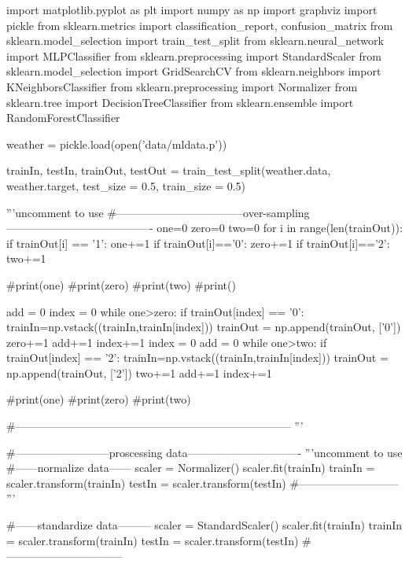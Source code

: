 \documentclass[12pt]{article}
\begin{document}
\begin{python}

import matplotlib.pyplot as plt
import numpy as np
import graphviz
import pickle
from sklearn.metrics import classification_report, confusion_matrix
from sklearn.model_selection import train_test_split
from sklearn.neural_network import MLPClassifier
from sklearn.preprocessing import StandardScaler
from sklearn.model_selection import GridSearchCV
from sklearn.neighbors import KNeighborsClassifier
from sklearn.preprocessing import Normalizer
from sklearn.tree import DecisionTreeClassifier
from sklearn.ensemble import RandomForestClassifier


weather = pickle.load(open('data/mldata.p'))






trainIn, testIn, trainOut, testOut = train_test_split(weather.data, weather.target, test_size = 0.5, train_size = 0.5)

'''uncomment to use
#-----------------------------------over-sampling----------------------------------------
one=0
zero=0
two=0
for i in range(len(trainOut)):
    if trainOut[i] == '1':
        one+=1
    if trainOut[i]=='0':
        zero+=1
    if trainOut[i]=='2':
        two+=1

#print(one)
#print(zero)
#print(two)
#print()

add = 0
index = 0
while one>zero:
    if trainOut[index] == '0':
        trainIn=np.vstack((trainIn,trainIn[index]))
        trainOut = np.append(trainOut, ['0'])
        zero+=1
        add+=1
    index+=1
index = 0
add = 0
while one>two:
    if trainOut[index] == '2':
        trainIn=np.vstack((trainIn,trainIn[index]))
        trainOut = np.append(trainOut, ['2'])
        two+=1
        add+=1
    index+=1

#print(one)
#print(zero)
#print(two)

#---------------------------------------------------------------------------
'''

#--------------------------proscessing data-------------------------------
'''uncomment to use
#------normalize data------
scaler = Normalizer()
scaler.fit(trainIn)
trainIn = scaler.transform(trainIn)
testIn = scaler.transform(testIn)
#---------------------------
'''

#------standardize data---------
scaler = StandardScaler()
scaler.fit(trainIn)
trainIn = scaler.transform(trainIn)
testIn = scaler.transform(testIn)
#--------------------------------


\end{python}
\end{document}
